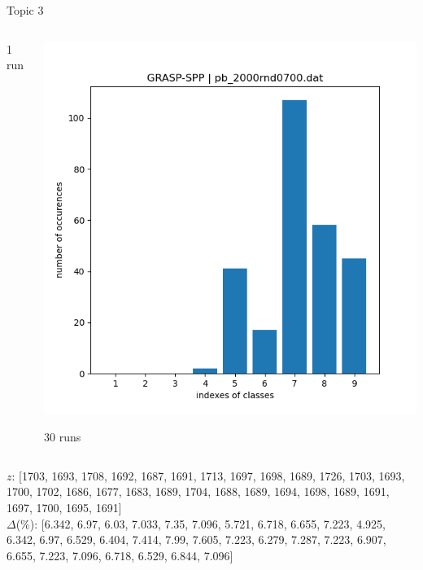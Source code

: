 \documentclass[10pt,xcolor=dvipsnames]{beamer}
\begin{document}
\begin{frame}{Topic 3}
\begin{columns}
\begin{column}{0.575\textwidth}
1 run
\end{column}
\begin{column}{0.45\textwidth}
\centering
 \includegraphics[scale=0.3]{all2000_700.png}
 
 30 runs
\end{column}
\end{columns}

{\tiny
$z$: 
[1703, 1693, 1708, 1692, 1687, 1691, 1713, 1697, 1698, 1689, 1726, 1703, 1693, 1700, 1702, 1686, 1677, 1683, 1689, 1704, 1688, 1689, 1694, 1698, 1689, 1691, 1697, 1700, 1695, 1691]\vspace{1mm}\\
$\Delta$(\%): 
[6.342, 6.97, 6.03, 7.033, 7.35, 7.096, 5.721, 6.718, 6.655, 7.223, 4.925, 6.342, 6.97, 6.529, 6.404, 7.414, 7.99, 7.605, 7.223, 6.279, 7.287, 7.223, 6.907, 6.655, 7.223, 7.096, 6.718, 6.529, 6.844, 7.096]\\
}

\end{frame}
\end{document}
